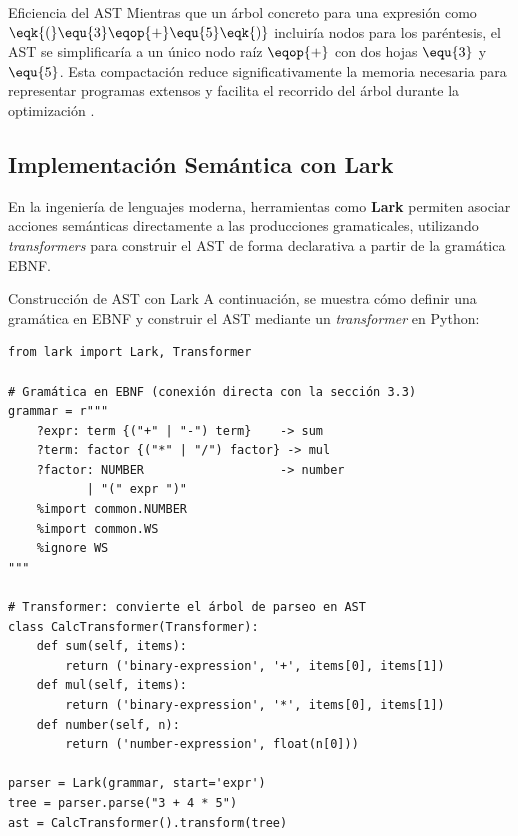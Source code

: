 \begin{observacion}{Eficiencia del AST}
Mientras que un árbol concreto para una expresión como $\eqk{(}\equ{3}\eqop{+}\equ{5}\eqk{)}$ incluiría nodos para los paréntesis, el AST se simplificaría a un único nodo raíz $\eqop{+}$ con dos hojas $\equ{3}$ y $\equ{5}$. Esta compactación reduce significativamente la memoria necesaria para representar programas extensos y facilita el recorrido del árbol durante la optimización \cite{aho2006compilers}.
\end{observacion}

\subsection{Implementación Semántica con Lark}
\label{subsec:3_7_4_implementacion}

En la ingeniería de lenguajes moderna, herramientas como \textbf{Lark} \cite{lark2025} permiten asociar acciones semánticas directamente a las producciones gramaticales, utilizando \textit{transformers} para construir el AST de forma declarativa a partir de la gramática EBNF.

\begin{ejemplo}{Construcción de AST con Lark}
A continuación, se muestra cómo definir una gramática en EBNF y construir el AST mediante un \textit{transformer} en Python:

\begin{lstlisting}[style=python, caption={Implementación de semántica y AST con Lark}]
from lark import Lark, Transformer

# Gramática en EBNF (conexión directa con la sección 3.3)
grammar = r"""
    ?expr: term {("+" | "-") term}    -> sum
    ?term: factor {("*" | "/") factor} -> mul
    ?factor: NUMBER                   -> number
           | "(" expr ")"
    %import common.NUMBER
    %import common.WS
    %ignore WS
"""

# Transformer: convierte el árbol de parseo en AST
class CalcTransformer(Transformer):
    def sum(self, items):
        return ('binary-expression', '+', items[0], items[1])
    def mul(self, items):
        return ('binary-expression', '*', items[0], items[1])
    def number(self, n):
        return ('number-expression', float(n[0]))

parser = Lark(grammar, start='expr')
tree = parser.parse("3 + 4 * 5")
ast = CalcTransformer().transform(tree)
\end{lstlisting}
\end{ejemplo}

